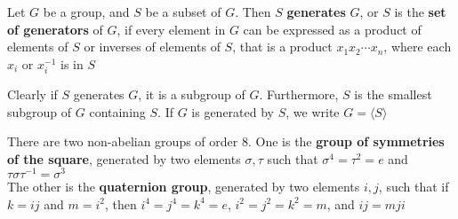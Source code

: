  \begin{definition}
    Let $G$ be a group, and $S$ be a subset of $G$. Then $S$ \textbf{generates} $G$, or $S$ is the \textbf{set of generators} of $G$, if every element in $G$ can be expressed
    as a product of elements of $S$ or inverses of elements of $S$, that is a product $x_1 x_2 \cdots x_n$, where each $x_i$ or $x_i^{-1}$ is in $S$ 
 \end{definition}

 Clearly if $S$ generates $G$, it is a subgroup of $G$. Furthermore, $S$ is the smallest subgroup of $G$ containing $S$. If $G$ is generated by $S$, we write $G = \langle S \rangle$

 \begin{exmp}
    There are two non-abelian groups of order $8$. One is the \textbf{group of symmetries of the square}, generated by two elements $\sigma, \tau$ such that 
    $\sigma^4 = \tau^2 = e$ and $\tau \sigma \tau^{-1} = \sigma^3 $ \\
    The other is the \textbf{quaternion group}, generated by two elements $i, j$, such that if $k = ij$ and $m = i^2$, then $i^4 = j^4 = k^4 = e$, $i^2 = j^2 = k^2 = m$, and $ij = mji$
 \end{exmp}
